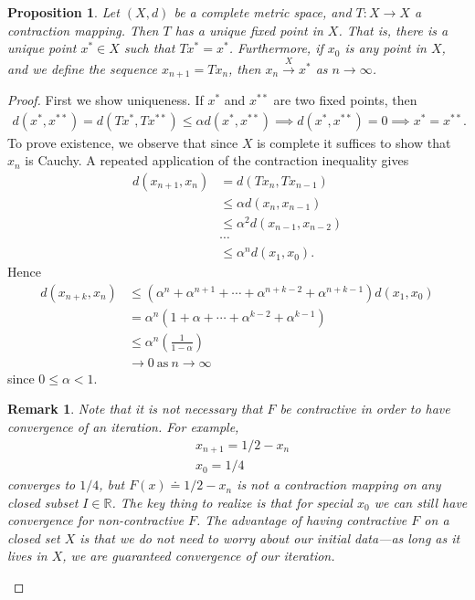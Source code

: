\documentclass[12pt,reqno]{amsart}
\numberwithin{equation}{section}  %
\newcommand{\rr}{\mathbb{R}}
\newtheorem{proposition}[theorem]{Proposition}
\newtheorem*{remark}{Remark}
\begin{document}
	\begin{proposition}
		\label{lem:fixed-point}
	Let $(X,d)$ be a complete metric space, and $T: X \to X$ a contraction
	mapping. Then $T$ has a unique fixed point in $X$. That is, there is a unique
	point $x^* \in X$ such that $Tx^* = x^*$. Furthermore, if $x_0$ is any point
  in $X$, and we define the sequence $x_{n+1} = Tx_n$, then $x_n \xrightarrow{X} x^*$ as $n
	\to \infty$.
	\end{proposition}
  \begin{proof} First we show uniqueness. If $x^*$ and $x^{**}$ are two fixed
	points, then
	\begin{equation*}
		\begin{split}
			d(x^*, x^{**}) = d(Tx^*, Tx^{**}) \le \alpha d(x^*, x^{**}) \implies d(x^*,
			x^{**}) = 0 \implies x^* = x^{**}.
		\end{split}
	\end{equation*}
To prove existence, we observe that since $X$ is complete it suffices to show
that $x_n$ is Cauchy. A repeated application of the
contraction inequality gives
\begin{equation*}
	\begin{split}
		d\left( x_{n+1},x_n \right)
		& = d\left( Tx_n, Tx_{n-1} \right)
		\\
		& \le \alpha d\left( x_n, x_{n-1} \right)
		\\
		& \le \alpha^2 d\left( x_{n-1}, x_{n-2} \right)
		\\
		& \cdots
		\\
		& \le \alpha^n d\left( x_1, x_0 \right).
	\end{split}
\end{equation*}
Hence
\begin{equation*}
\begin{split}
  d\left( x_{n+k},x_n \right)
  & \le (\alpha^{n } +\alpha^{n+1} + \cdots +
  \alpha^{n+k-2} + \alpha^{n+k-1})d(x_{1}, x_{0}) 
  \\
  & = \alpha^{n}(1 + \alpha + \cdots + \alpha^{k-2} + \alpha^{k-1})
  \\
  & \le \alpha^{n}\left( \frac{1}{1 - \alpha} \right)
  \\
  & \to 0 \ \text{as} \ n \to \infty
\end{split}
\end{equation*}
since $0 \le \alpha < 1$. 
\begin{remark}
Note that it is not necessary that $F$ be contractive in order to 
have convergence of an iteration. For example,
\begin{align*}
& x_{n+1} = 1/2 - x_n
\\
& x_0 = 1/4
\end{align*}
converges to $1/4$, but $F(x) \doteq 1/2 - x_n$ is not a contraction mapping
on any closed subset $I \in \rr$. The key thing to realize is that
for \emph{special} $x_0$ we can still have convergence for non-contractive $F$.
The advantage of having contractive $F$ on a closed set $X$ is that we do not need to worry
about our initial data---as long as it lives in $X$,
we are guaranteed convergence of our iteration.
\end{remark}
\end{proof}
\end{document}

